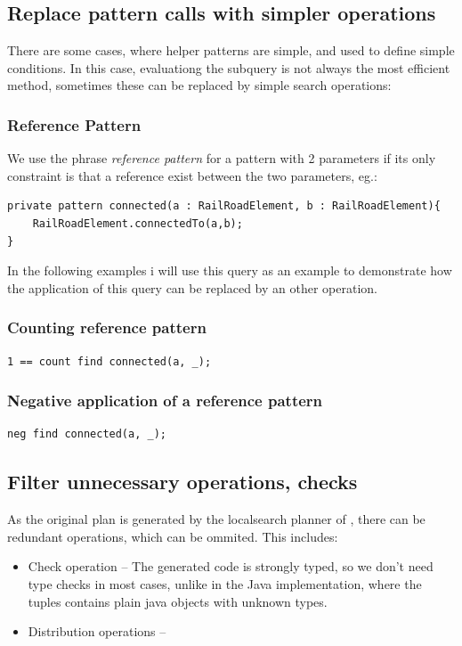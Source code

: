 \subsection{Replace pattern calls with simpler operations}
There are some cases, where helper patterns are simple, and used to define simple conditions. 
In this case, evaluationg the subquery is not always the most efficient method, sometimes these can be replaced by simple search operations:

\subsubsection{Reference Pattern}
We use the phrase \emph{reference pattern} for a pattern with 2 parameters if its only constraint is that a reference exist between the two parameters, eg.:
\begin{lstlisting}[language = vql]
private pattern connected(a : RailRoadElement, b : RailRoadElement){
	RailRoadElement.connectedTo(a,b);
}
\end{lstlisting}

In the following examples i will use this query as an example to demonstrate how the application of this query can be replaced by an other operation.

\subsubsection{Counting reference pattern}
\begin{lstlisting}[language = vql]
1 == count find connected(a, _);
\end{lstlisting}


\subsubsection{Negative application of a reference pattern}

\begin{lstlisting}[language = vql]
neg find connected(a, _);
\end{lstlisting}

\subsection{Filter unnecessary operations, checks}
As the original plan is generated by the localsearch planner of \viatra{}, there can be redundant operations, which can be ommited. This includes:

\begin{itemize}
	\item Check operation -- The generated code is strongly typed, so we don't need type checks in most cases, unlike in the Java implementation, where the tuples contains plain java objects with unknown types.
	
	\item Distribution operations -- 
\end{itemize}



